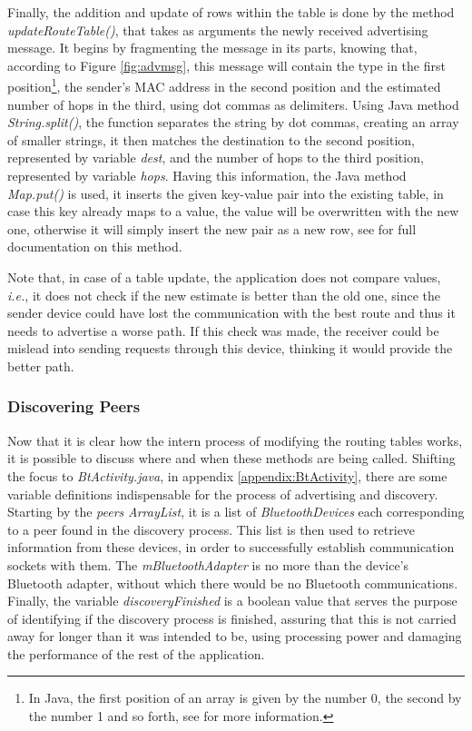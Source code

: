 Finally, the addition and update of rows within the table is done by the method \textit{updateRouteTable()}, that takes as arguments the newly received advertising message. It begins by fragmenting the message in its parts, knowing that, according to Figure \ref{fig:advmsg}, this message will contain the type in the first position\footnote{In Java, the first position of an array is given by the number 0, the second by the number 1 and so forth, see \cite{arrays} for more information.}, the sender's \gls{MAC} address in the second position and the estimated number of hops in the third, using dot commas as delimiters. Using Java method \textit{String.split()}, the function separates the string by dot commas, creating an array of smaller strings, it then matches the destination to the second position, represented by variable \textit{dest}, and the number of hops to the third position, represented by variable \textit{hops}. Having this information, the Java method \textit{Map.put()} is used, it inserts the given key-value pair into the existing table, in case this key already maps to a value, the value will be overwritten with the new one, otherwise it will simply insert the new pair as a new row, see \cite{map} for full documentation on this method. 

Note that, in case of a table update, the application does not compare values, \textit{i.e.}, it does not check if the new estimate is better than the old one, since the sender device could have lost the communication with the best route and thus it needs to advertise a worse path. If this check was made, the receiver could be mislead into sending requests through this device, thinking it would provide the better path.

\subsubsection{Discovering Peers}
\label{subsubsec:disc}

Now that it is clear how the intern process of modifying the routing tables works, it is possible to discuss where and when these methods are being called. Shifting the focus to \textit{BtActivity.java}, in appendix \ref{appendix:BtActivity}, there are some variable definitions indispensable for the process of advertising and discovery. Starting by the \textit{peers} \textit{ArrayList}, it is a list of \textit{BluetoothDevices} each corresponding to a peer found in the discovery process. This list is then used to retrieve information from these devices, in order to successfully establish communication sockets with them. The \textit{mBluetoothAdapter} is no more than the device's Bluetooth adapter, without which there would be no Bluetooth communications. Finally, the variable \textit{discoveryFinished} is a boolean value that serves the purpose of identifying if the discovery process is finished, assuring that this is not carried away for longer than it was intended to be, using processing power and damaging the performance of the rest of the application.

